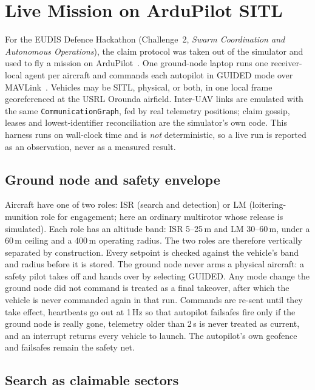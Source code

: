 \documentclass[conference]{IEEEtran}
\newcommand{\code}[1]{\texttt{#1}}    %
\begin{document}
\section{Live Mission on ArduPilot SITL}
\label{sec:live}

For the EUDIS Defence Hackathon (Challenge~2, \emph{Swarm Coordination and
Autonomous Operations}), the claim protocol was taken out of the simulator and
used to fly a mission on ArduPilot~\cite{ardupilot}. One ground-node laptop
runs one receiver-local agent per aircraft and commands each autopilot in
GUIDED mode over MAVLink~\cite{koubaa2019mavlink}. Vehicles may be SITL,
physical, or both, in one local frame georeferenced at the USRL Orounda
airfield. Inter-UAV links are emulated with the same \code{CommunicationGraph},
fed by real telemetry positions; claim gossip, leases and lowest-identifier
reconciliation are the simulator's own code. This harness runs on wall-clock
time and is \emph{not} deterministic, so a live run is reported as an
observation, never as a measured result.

\subsection{Ground node and safety envelope}

Aircraft have one of two roles: ISR (search and detection) or LM
(loitering-munition role for engagement; here an ordinary multirotor whose
release is simulated). Each role has an altitude band: ISR 5--25\,m and LM 30--60\,m, under a
60\,m ceiling and a 400\,m operating radius. The two roles are therefore
vertically separated by construction. Every setpoint is checked against the
vehicle's band and radius before it is stored. The ground node never arms a
physical aircraft: a safety pilot takes off and hands over by selecting
GUIDED. Any mode change the ground node did not command is treated as a final
takeover, after which the vehicle is never commanded again in that run.
Commands are re-sent until they take effect, heartbeats go out at 1\,Hz so
that autopilot failsafes fire only if the ground node is really gone,
telemetry older than 2\,s is never treated as current, and an interrupt
returns every vehicle to launch. The autopilot's own geofence and failsafes
remain the safety net.

\subsection{Search as claimable sectors}
\end{document}
